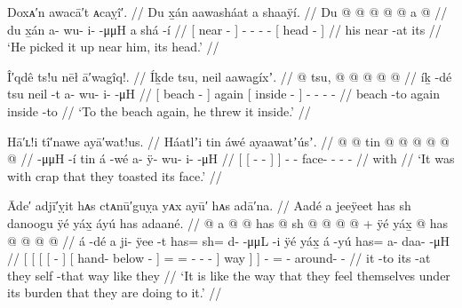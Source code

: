\ex\label{ex:91-193-pick-up-head}%
%
\begingl
	\glpreamble	Doxᴀ′n awacā′t ᴀcaỵî′. //
	\glpreamble	Du x̱án aawasháat a shaaÿí. //
	\gla	{} Du  @ {} {}  @ {} @ {} @ {} @ {}
		{} a  @ {} {} //
	\glb	{} du x̱án {} {} a- wu- i-  -μμH
		{} a shá -í {} //
	\glc	{}[  near - {}]
		- - -  -
		{}[  head - {}] //
	\gld	{} his near -at {}  {} {} {} {}
		{} its  {} {} //
	\glft	‘He picked it up near him, its head.’
		//
\endgl
\xe

\ex\label{ex:91-194-beach-again-throw-inside}%
%
\begingl
	\glpreamble	Î′qdê ts!u nēł ā′wagîq!. //
	\glpreamble	Íḵde tsu, neil aawag̱íxʼ. //
	\gla	{}  @ {} {} tsu,
		{}  @ {} {}  @ {} @ {} @ {} @ {} //
	\glb	{} íḵ -dé {} tsu
		{} neil -t {} a- wu- i-  -μH //
	\glc	{}[ beach - {}] again
		{}[ inside - {}]
		- - -  - //
	\gld	{} beach -to {} again
		{} inside -to {}  {} {} {} {} //
	\glft	‘To the beach again, he threw it inside.’
		//
\endgl
\xe

\ex\label{ex:91-195-toast-with-crap}%
%
\begingl
	\glpreamble	Hā′ʟ!i tî′nawe ayā′wat!us. //
	\glpreamble	Háatlʼi tin áwé ayaawatʼúsʼ. //
	\gla	{} {}  @ {} @ {} {} tin {}  @ {}
		 @ {} @ {} @ {} @ {} @ {} //
	\glb	{} {}  -μμH -í {} tin {} á -wé
		a- ÿ- wu- i-  -μH //
	\glc	{}[ {}[  - - {}]  {}]
		 -
		- face- - -  - //
	\gld	{} {}  {} {} {} with {}  {}
		 {} {} {} {} {} //
	\glft	‘It was with crap that they toasted its face.’
		//
\endgl
\xe

\ex\label{ex:91-196-do-however-they-feel}%
%
\begingl
	\glpreamble	Āde′ adjī′ỵit hᴀs ctᴀnū′guỵa yᴀx ayū′ hᴀs adā′na. //
	\glpreamble	Aadé a jeeÿeet has sh danoogu ÿé yáx̱ áyú has adaané. //
	\gla	{} {} {} {}  @ {} {}
			{} a  @ {} @ {} {}
			has @ sh @  @ {} @ {} @ {} {} +
			ÿé {} yáx̱ {}  @ {}
		has @  @ {} @ {} @ {} //
	\glb	{} {} {} {} á -dé {}
			{} a ji- ÿee -t {}
			has= sh= d-  -μμL -i {}
			ÿé {} yáx̱ {} á -yú
		has= a- daa-  -μH //
	\glc	{}[ {}[ {}[ {}[  - {}]
			{}[  hand- below - {}]
			= = -  - - {}]
			way {}]  {}]  -
		= - around-  - //
	\gld	{} {} {} {} it -to {}
			{} its  {} -at {}
			they self  {} {} -that {}
			way {} like {}  {}
		they  {} {} {} //
	\glft	‘It is like the way that they feel themselves under its burden that they are doing to it.’
		//
\endgl
\xe

